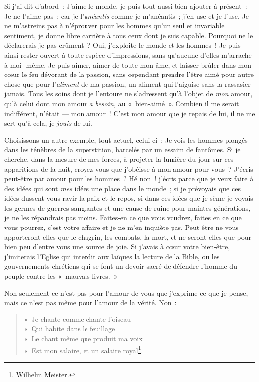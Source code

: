 \documentclass[french,twoside]{book} %
\begin{document}
Si j’ai dit d’abord : J’aime le monde, je puis tout aussi bien ajouter à présent : Je ne l’aime pas : car je l’\emph{anéantis} comme je m’anéantis ; j’en use et je l’use. Je ne m’astreins pas à n’éprouver pour les hommes qu’un seul et invariable sentiment, je donne libre carrière à tous ceux dont je suis capable. Pourquoi ne le déclarerais-je pas crûment ? Oui, j’exploite le monde et les hommes ! Je puis ainsi rester ouvert à toute espèce d’impressions, sans qu’aucune d’elles m’arrache à moi -même. Je puis aimer, aimer de toute mon âme, et laisser brûler dans mon cœur le feu dévorant de la passion, sans cependant prendre l’être aimé pour autre chose que pour l’\emph{aliment} de ma passion, un aliment qui l’aiguise sans la rassasier jamais. Tous les soins dont je l’entoure ne s’adressent qu’à l’objet de \emph{mon} amour, qu’à celui dont mon amour \emph{a besoin,} au « bien-aimé ». Combien il me serait indifférent, n’était — mon amour ! C’est mon amour que je repais de lui, il ne me sert qu’à cela, je \emph{jouis} de lui.\par
Choisissons un autre exemple, tout actuel, celui-ci : Je vois les hommes plongés dans les ténèbres de la superstition, harcelés par un essaim de fantômes. Si je  cherche, dans la mesure de mes forces, à projeter la lumière du jour sur ces apparitions de la nuit, croyez-vous que j’obéisse à mon amour pour vous ? J’écris peut-être par amour pour les hommes ? Hé non ! j’écris parce que je veux faire à des idées qui sont \emph{mes} idées une place dans le monde ; si je prévoyais que ces idées dussent vous ravir la paix et le repos, si dans ces idées que je sème je voyais les germes de guerres sanglantes et une cause de ruine pour maintes générations, je ne les répandrais pas moins. Faites-en ce que vous voudrez, faites en ce que vous pourrez, c’est votre affaire et je ne m’en inquiète pas. Peut être ne vous apporteront-elles que le chagrin, les combats, la mort, et ne seront-elles que pour bien peu d’entre vous une source de joie. Si j’avais à cœur votre bien-être, j’imiterais l’Eglise qui interdit aux laïques la lecture de la Bible, ou les gouvernements chrétiens qui se font un devoir sacré de défendre l’homme du peuple contre les « mauvais livres. »\par
Non seulement ce n’est pas pour l’amour de vous que j’exprime ce que je pense, mais ce n’est pas même pour l’amour de la vérité. Non :\par


\begin{verse}
« Je chante comme chante l’oiseau\\
« Qui habite dans le feuillage\\
« Le chant même que produit ma voix\\
« Est mon salaire, et un salaire royal\footnote{ \noindent Wilhelm Meister.
 }.\\
\end{verse}
\end{document}
